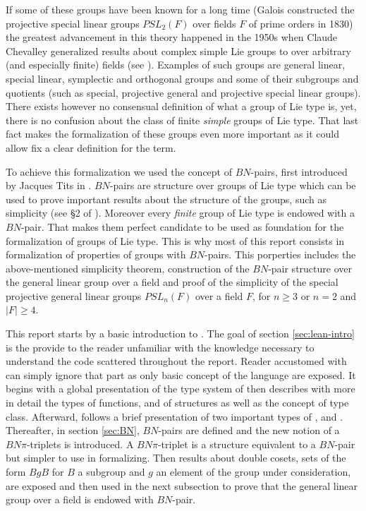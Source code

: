 If some of these groups have been known for a long time (Galois constructed the projective special linear groups $PSL_2(F)$ over fields $F$ of prime orders in 1830) the greatest advancement in this theory happened in the 1950s when Claude Chevalley generalized results about complex simple Lie groups to over arbitrary (and especially finite) fields (see \cite{carter_finite_1985}). Examples of such groups are general linear, special linear, symplectic and orthogonal groups and some of their subgroups and quotients (such as special, projective general and projective special linear groups). There exists however no consensual definition of what a group of Lie type is, yet, there is no confusion about the class of finite \emph{simple} groups of Lie type.
That last fact makes the formalization of these groups even more important as it could allow fix a clear definition for the term.

To achieve this formalization we used the concept of $BN$-pairs, first introduced by Jacques Tits in \cite{tits_algebraic_1964}. $BN$-pairs are structure over groups of Lie type which can be used to prove important results about the structure of the groups, such as simplicity (see §2 of \cite{bourbaki_groupes_2007}). Moreover every \emph{finite} group of Lie type is endowed with a $BN$-pair. That makes them perfect candidate to be used as foundation for the formalization of groups of Lie type. This is why most of this report consists in formalization of properties of groups with $BN$-pairs. This porperties includes the above-mentioned simplicity theorem, construction of the $BN$-pair structure over the general linear group over a field and proof of the simplicity of the special projective general linear groups $PSL_n(F)$ over a field $F$, for $n \ge 3$ or $n = 2$ and $|F| \ge 4$.




    This report starts by a basic introduction to \Lean. The goal of section \ref{sec:lean-intro} is the provide to the reader unfamiliar with \Lean the knowledge necessary to understand the code scattered throughout the report. Reader accustomed with \Lean can simply ignore that part as only basic concept of the language are exposed. It begins with a global presentation of the type system of \Lean then describes with more in detail the types of functions, and of structures as well as the concept of type class. Afterward, follows a brief presentation of two important types of \Lean,  and .
    Thereafter, in section \ref{sec:BN}, $BN$-pairs are defined and the new notion of a $BN\pi$-triplets is introduced. A $BN\pi$-triplet is a structure equivalent to a $BN$-pair but simpler to use in formalizing. Then results about double cosets, sets of the form $BgB$ for $B$ a subgroup and $g$ an element of the group under consideration, are exposed and then used in the next subsection to prove that the general linear group over a field is endowed with $BN$-pair.

